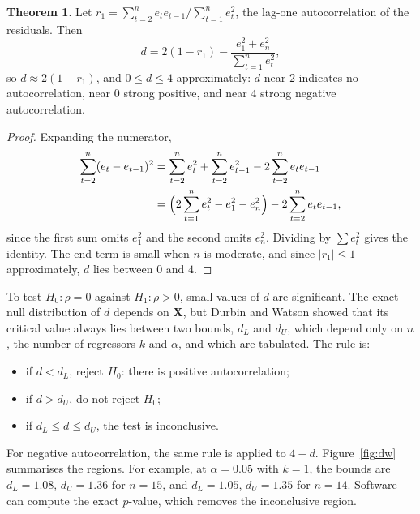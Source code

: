 \documentclass[11pt,a4paper]{article}
\numberwithin{equation}{section}
\theoremstyle{definition}
\newtheorem{thm}{Theorem}[subsection]
\begin{document}
\begin{thm}\label{thm:dw}
Let $r_1 = \sum_{t=2}^ne_te_{t-1}\big/\sum_{t=1}^ne_t^2$, the lag-one autocorrelation of the residuals. Then
\[
d = 2(1 - r_1) - \frac{e_1^2 + e_n^2}{\sum_{t=1}^ne_t^2} ,
\]
so $d \approx 2(1 - r_1)$, and $0 \le d \le 4$ approximately: $d$ near $2$ indicates no autocorrelation, near $0$ strong positive,
and near $4$ strong negative autocorrelation.
\end{thm}

\begin{proof}
Expanding the numerator,
\begin{align*}
\sum_{t=2}^n(e_t - e_{t-1})^2 &= \sum_{t=2}^ne_t^2 + \sum_{t=2}^ne_{t-1}^2 - 2\sum_{t=2}^ne_te_{t-1} \\
&= \Bigl(2\sum_{t=1}^ne_t^2 - e_1^2 - e_n^2\Bigr) - 2\sum_{t=2}^ne_te_{t-1} ,
\end{align*}
since the first sum omits $e_1^2$ and the second omits $e_n^2$. Dividing by $\sum e_t^2$ gives the identity. The end term is
small when $n$ is moderate, and since $|r_1| \le 1$ approximately, $d$ lies between $0$ and $4$.
\end{proof}

To test $H_0\colon \rho = 0$ against $H_1\colon \rho > 0$, small values of $d$ are significant. The exact null distribution of $d$
depends on $\mathbf{X}$, but Durbin and Watson showed that its critical value always lies between two bounds,
$d_L$ and $d_U$, which depend only on $n$, the number of regressors $k$ and $\alpha$, and which are tabulated. The rule is:
\begin{itemize}
\item if $d < d_L$, reject $H_0$: there is positive autocorrelation;
\item if $d > d_U$, do not reject $H_0$;
\item if $d_L \le d \le d_U$, the test is inconclusive.
\end{itemize}
For negative autocorrelation, the same rule is applied to $4 - d$. Figure~\ref{fig:dw} summarises the regions. For
example, at $\alpha = 0.05$ with $k = 1$, the bounds are $d_L = 1.08$, $d_U = 1.36$ for $n = 15$, and $d_L = 1.05$, $d_U = 1.35$ for $n = 14$.
Software can compute the exact $p$-value, which removes the inconclusive region.
\end{document}
